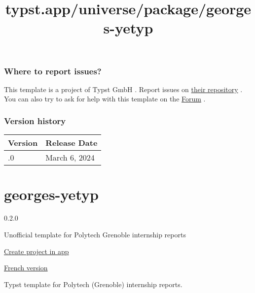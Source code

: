 \subsubsection{Where to report issues?}\label{where-to-report-issues}

This template is a project of Typst GmbH . Report issues on
\href{https://github.com/typst/templates}{their repository} . You can
also try to ask for help with this template on the
\href{https://forum.typst.app}{Forum} .

\label{versions}
\subsubsection{Version history}\label{version-history}

\begin{longtable}[]{@{}ll@{}}
\toprule\noalign{}
Version & Release Date \\
\midrule\noalign{}
\endhead
\bottomrule\noalign{}
\endlastfoot
0.1.0 & March 6, 2024 \\
\end{longtable}


\title{typst.app/universe/package/georges-yetyp}

\label{banner}
\label{template-thumbnail}

\section{georges-yetyp}\label{georges-yetyp}

{ 0.2.0 }

Unofficial template for Polytech Grenoble internship reports

\href{/app?template=georges-yetyp&version=0.2.0}{Create project in app}

\label{readme}
\href{https://github.com/typst/packages/raw/main/packages/preview/georges-yetyp/0.2.0/README.fr.md}{French
version}

Typst template for Polytech (Grenoble) internship reports.

\href{https://github.com/typst/packages/raw/main/packages/preview/georges-yetyp/0.2.0/thumbnail.png}{}

